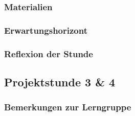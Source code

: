 \subsubsection{Materialien}
\noindent{}
\subsubsection{Erwartungshorizont}
\subsubsection{Reflexion der Stunde}
\newpage
\subsection{Projektstunde 3 \& 4}\ellen
\subsubsection{Bemerkungen zur Lerngruppe}
